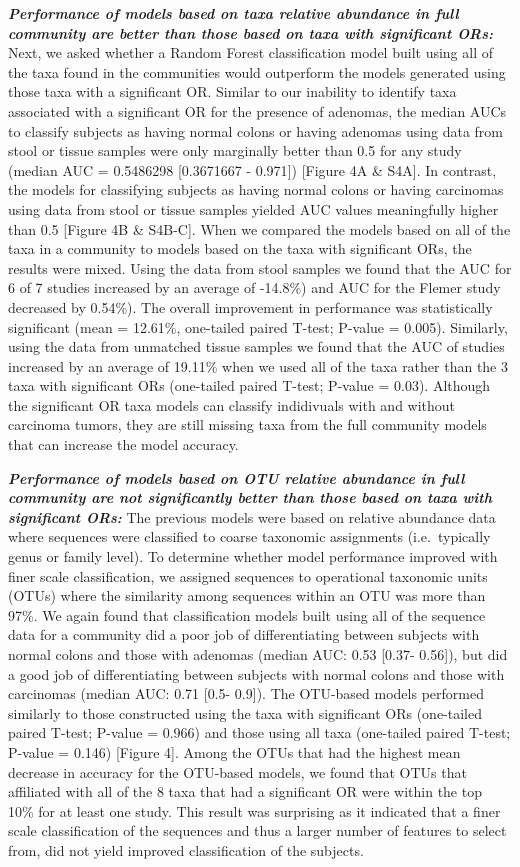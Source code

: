 \documentclass[12pt,]{article}
\begin{document}
\textbf{\emph{Performance of models based on taxa relative abundance in
full community are better than those based on taxa with significant
ORs:}} Next, we asked whether a Random Forest classification model built
using all of the taxa found in the communities would outperform the
models generated using those taxa with a significant OR. Similar to our
inability to identify taxa associated with a significant OR for the
presence of adenomas, the median AUCs to classify subjects as having
normal colons or having adenomas using data from stool or tissue samples
were only marginally better than 0.5 for any study (median AUC =
0.5486298 {[}0.3671667 - 0.971{]}) {[}Figure 4A \& S4A{]}. In contrast,
the models for classifying subjects as having normal colons or having
carcinomas using data from stool or tissue samples yielded AUC values
meaningfully higher than 0.5 {[}Figure 4B \& S4B-C{]}. When we compared
the models based on all of the taxa in a community to models based on
the taxa with significant ORs, the results were mixed. Using the data
from stool samples we found that the AUC for 6 of 7 studies increased by
an average of -14.8\%) and AUC for the Flemer study decreased by
0.54\%). The overall improvement in performance was statistically
significant (mean = 12.61\%, one-tailed paired T-test; P-value = 0.005).
Similarly, using the data from unmatched tissue samples we found that
the AUC of studies increased by an average of 19.11\% when we used all
of the taxa rather than the 3 taxa with significant ORs (one-tailed
paired T-test; P-value = 0.03). Although the significant OR taxa models
can classify indidivuals with and without carcinoma tumors, they are
still missing taxa from the full community models that can increase the
model accuracy.

\textbf{\emph{Performance of models based on OTU relative abundance in
full community are not significantly better than those based on taxa
with significant ORs:}} The previous models were based on relative
abundance data where sequences were classified to coarse taxonomic
assignments (i.e.~typically genus or family level). To determine whether
model performance improved with finer scale classification, we assigned
sequences to operational taxonomic units (OTUs) where the similarity
among sequences within an OTU was more than 97\%. We again found that
classification models built using all of the sequence data for a
community did a poor job of differentiating between subjects with normal
colons and those with adenomas (median AUC: 0.53 {[}0.37- 0.56{]}), but
did a good job of differentiating between subjects with normal colons
and those with carcinomas (median AUC: 0.71 {[}0.5- 0.9{]}). The
OTU-based models performed similarly to those constructed using the taxa
with significant ORs (one-tailed paired T-test; P-value = 0.966) and
those using all taxa (one-tailed paired T-test; P-value = 0.146)
{[}Figure 4{]}. Among the OTUs that had the highest mean decrease in
accuracy for the OTU-based models, we found that OTUs that affiliated
with all of the 8 taxa that had a significant OR were within the top
10\% for at least one study. This result was surprising as it indicated
that a finer scale classification of the sequences and thus a larger
number of features to select from, did not yield improved classification
of the subjects.
\end{document}
